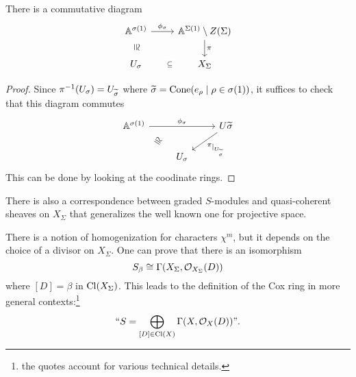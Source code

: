 \begin{proposition}[]
There is a commutative diagram
\[\begin{tikzcd}
	{\A^{\sigma(1)}} & {\A^{\Sigma(1)}\bs Z(\Sigma)} \\
	{U_\sigma} & {X_\Sigma}
	\arrow["{\phi_\sigma}", from=1-1, to=1-2]
	\arrow["\cong"{marking, allow upside down}, draw=none, from=1-1, to=2-1]
	\arrow["\pi", from=1-2, to=2-2]
	\arrow["\subseteq"{description}, draw=none, from=2-1, to=2-2]
\end{tikzcd}\]
\end{proposition}
\begin{proof}
Since $\pi^{-1}(U_\sigma)=U_{\widetilde{\sigma}}$ where $\widetilde{\sigma}=\operatorname{Cone}(e_\rho\mid\rho\in\sigma(1))$, it suffices to check that this diagram commutes
\[\begin{tikzcd}
	{\A^{\sigma(1)}} && {U{\wt \sigma}} \\
	& {U_\sigma}
	\arrow["{\phi_\sigma}", from=1-1, to=1-3]
	\arrow["\cong"{marking, allow upside down}, draw=none, from=1-1, to=2-2]
	\arrow["{\pi\res{U_{\wt \sigma}}}", from=1-3, to=2-2]
\end{tikzcd}\]
This can be done by looking at the coodinate rings.
\end{proof}



\begin{remark}
There is also a correspondence between graded $S$-modules and quasi-coherent sheaves on $X_\Sigma$ that generalizes the well known one for projective space.
\end{remark}



\begin{remark}
There is a notion of homogenization for characters $\chi^m$, but it depends on the choice of a divisor on $X_\Sigma$. One can prove that there is an isomorphism
\[S_\beta\cong \Gamma(X_\Sigma, \mathcal{O}_{X_\Sigma}(D))\]
where $[D]=\beta$ in $\operatorname{Cl}(X_\Sigma)$. This leads to the definition of the Cox ring in more general contexts:\footnote{the quotes account for various technical details.}
\[``S=\bigoplus_{[D]\in \operatorname{Cl}(X)}\Gamma(X,\mathcal{O}_{X}(D))".\]
\end{remark}

